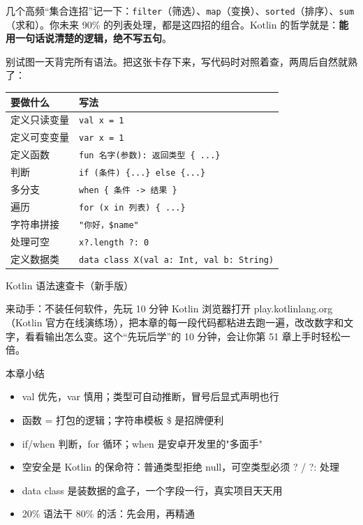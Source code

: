 几个高频“集合连招”记一下：\texttt{filter}（筛选）、\texttt{map}（变换）、\texttt{sorted}（排序）、\texttt{sum}（求和）。你未来 90\% 的列表处理，都是这四招的组合。Kotlin 的哲学就是：\textbf{能用一句话说清楚的逻辑，绝不写五句}。


别试图一天背完所有语法。把这张卡存下来，写代码时对照着查，两周后自然就熟了：

\begin{center}
\begin{tabularx}{\linewidth}{|X|X|}
\hline
\textbf{要做什么} & \textbf{写法} \tabularnewline
\hline
定义只读变量 & \texttt{val x = 1} \tabularnewline
定义可变变量 & \texttt{var x = 1} \tabularnewline
定义函数 & \texttt{fun 名字(参数): 返回类型 \{ .\allowbreak .\allowbreak .\allowbreak  \}} \tabularnewline
判断 & \texttt{if (条件) \{.\allowbreak .\allowbreak .\allowbreak \} else \{.\allowbreak .\allowbreak .\allowbreak \}} \tabularnewline
多分支 & \texttt{when \{ 条件 -\allowbreak > 结果 \}} \tabularnewline
遍历 & \texttt{for (x in 列表) \{ .\allowbreak .\allowbreak .\allowbreak  \}} \tabularnewline
字符串拼接 & \texttt{"你好，\$name"} \tabularnewline
处理可空 & \texttt{x?.\allowbreak length ?: 0} \tabularnewline
定义数据类 & \texttt{data class X(val a: Int, val b: String)} \tabularnewline
\hline
\end{tabularx}
\end{center}

\begin{center}\small\color{gray}Kotlin 语法速查卡（新手版）\end{center}

\begin{tcbpractice}{来动手：不装任何软件，先玩 10 分钟 Kotlin}
浏览器打开 play.kotlinlang.org（Kotlin 官方在线演练场），把本章的每一段代码都粘进去跑一遍，改改数字和文字，看看输出怎么变。这个“先玩后学”的 10 分钟，会让你第 51 章上手时轻松一倍。

\end{tcbpractice}

\begin{tcbsummary}{本章小结}
\begin{itemize}
  \item val 优先，var 慎用；类型可自动推断，冒号后显式声明也行
  \item 函数 = 打包的逻辑；字符串模板 \$ 是招牌便利
  \item if/when 判断，for 循环；when 是安卓开发里的"多面手"
  \item 空安全是 Kotlin 的保命符：普通类型拒绝 null，可空类型必须 ? / ?: 处理
  \item data class 是装数据的盒子，一个字段一行，真实项目天天用
  \item 20\% 语法干 80\% 的活：先会用，再精通
\end{itemize}

\end{tcbsummary}
